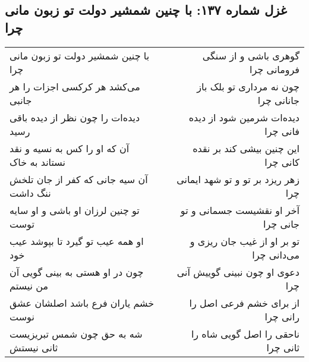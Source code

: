\begin{center}
\section*{غزل شماره ۱۳۷: با چنین شمشیر دولت تو زبون مانی چرا}
\label{sec:0137}
\begin{longtable}{l p{0.5cm} r}
با چنین شمشیر دولت تو زبون مانی چرا
&&
گوهری باشی و از سنگی فرومانی چرا
\\
می‌کشد هر کرکسی اجزات را هر جانبی
&&
چون نه مرداری تو بلک باز جانانی چرا
\\
دیده‌ات را چون نظر از دیده باقی رسید
&&
دیده‌ات شرمین شود از دیده فانی چرا
\\
آن که او را کس به نسیه و نقد نستاند به خاک
&&
این چنین بیشی کند بر نقده کانی چرا
\\
آن سیه جانی که کفر از جان تلخش ننگ داشت
&&
زهر ریزد بر تو و تو شهد ایمانی چرا
\\
تو چنین لرزان او باشی و او سایه توست
&&
آخر او نقشیست جسمانی و تو جانی چرا
\\
او همه عیب تو گیرد تا بپوشد عیب خود
&&
تو بر او از غیب جان ریزی و می‌دانی چرا
\\
چون در او هستی به بینی گویی آن من نیستم
&&
دعوی او چون نبینی گوییش آنی چرا
\\
خشم یاران فرع باشد اصلشان عشق نوست
&&
از برای خشم فرعی اصل را رانی چرا
\\
شه به حق چون شمس تبریزیست ثانی نیستش
&&
ناحقی را اصل گویی شاه را ثانی چرا
\\
\end{longtable}
\end{center}

